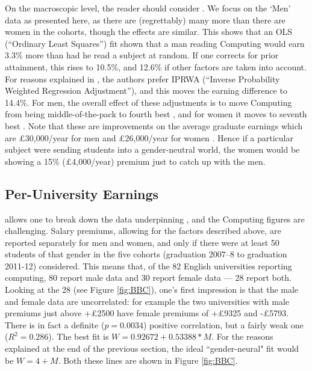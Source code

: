 \documentclass[sigconf]{acmart}
\begin{document}
On the macroscopic level, the reader should consider \cite[Table
5]{DfE2018d}. We focus on the `Men' data as presented here, as there
are (regrettably) many more than there are women in the cohorts,
though the effects are similar. This shows that an OLS (``Ordinary
Least Squares'') fit shown that a man reading Computing would earn
3.3\% more than had he read a subject at random. If one corrects for
prior attainment, this rises to 10.5\%, and 12.6\% if other factors
are taken into account. For reasons explained in
\cite[\S4.2]{DfE2018d}, the authors prefer IPRWA (``Inverse
Probability Weighted Regression Adjustment''), and this moves the
earning difference to 14.4\%. For men, the overall effect of these
adjustments is to move Computing from being middle-of-the-pack
\cite[Figure 15]{DfE2018d} to fourth best \cite[Figure 17]{DfE2018d},
and for women it moves to seventh best \cite[Figure
16]{DfE2018d}. Note that these are improvements on the average
graduate earnings which are \pounds30,000/year for men and
\pounds26,000/year for women \cite[p. 37]{DfE2018d}. Hence if a
particular subject were sending students into a gender-neutral world,
the women would be showing a 15\% (\pounds4,000/year) premium just to
catch up with the men.

\subsection{Per-University Earnings}

\cite{BBC2018f} allows one to break down the data underpinning
\cite{DfE2018d}, and the Computing figures are challenging.  Salary
premiums, allowing for the factors described above, are reported
separately for men and women, and only if there were at least 50
students of that gender in the five cohorts (graduation 2007--8 to
graduation 2011-12) considered. This means that, of the 82 English
universities reporting computing, 80 report male data and 30 report
female data --- 28 report both. Looking at the 28 (see Figure
\ref{fig:BBC}), one's first impression is that the male and female
data are uncorrelated: for example the two universities with male
premiums just above +\pounds2500 have female premiums of +\pounds9325
and -\pounds5793. There is in fact a definite ($p=0.0034$) positive
correlation, but a fairly weak one ($R^2=0.286$). The best fit is
$W=0.92672+0.53388*M$. For the reasons explained at the end of the
previous section, the ideal ``gender-neural" fit would be
$W=4+M$. Both these lines are shown in Figure \ref{fig:BBC}.
\end{document}
